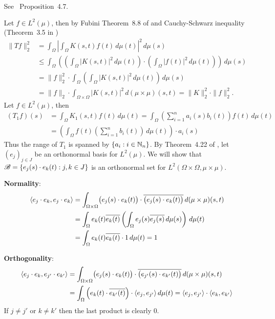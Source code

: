 \begin{enumerate}
See \cite{Conway1990}~Proposition~4.7.
\begin{itemize}
Let \(f\in L^2(\mu)\),
then by Fubini  Theorem~8.8 of \cite{RudinRCA80}
and Cauchy-Schwarz  inequality
(Theorem~3.5 in \cite{RudinRCA80}) 
\begin{align*}
\|Tf\|_2^2 
&= \int_\Omega\left|\int_\Omega K(s,t)f(t)\,d\mu(t)\right|^2\,d\mu(s) \\
&\leq \int_\Omega
   \left(
   \left(\int_\Omega |K(s,t)|^2\,d\mu(t)\right)
   \cdot
   \left(\int_\Omega |f(t)|^2\,d\mu(t)\right)
   \right)
   \,d\mu(s) \\
&= \|f\|_2^2 \cdot
   \int_\Omega\left(\int_\Omega |K(s,t)|^2\,d\mu(t)\right)\,d\mu(s) \\
&= \|f\|_2 \cdot \int_{\Omega\times\Omega} |K(s,t)|^2\,d(\mu\times\mu)(s,t)
 = \|K\|_2^2 \cdot \|f\|_2^2.
\end{align*}
Let \(f\in L^2(\mu)\), then
\begin{align*}
(T_1f)(s) 
&= \int_\Omega K_1(s,t)f(t)\,d\mu(t)
 = \int_\Omega \left(\sum_{i=1}^n a_i(s)b_i(t)\right)f(t)\,d\mu(t) \\
&= \left(\int_\Omega f(t)\left(\sum_{i=1}^n b_i(t)\right)\,d\mu(t)\right)
    \cdot a_i(s)
\end{align*}
Thus the range of \(T_1\) is spanned by \(\{a_i:i\in\mathbb{N}_n\}\). 
By Theorem~4.22 of \cite{RudinRCA80}, let \((e_j)_{j\in J}\) be 
an orthonormal basis for \(L^2(\mu)\).
We will show that \(\mathscr{B} = \{e_j(s)\cdot e_k(t): j,k\in J\}\)
is an orthonormal set %
for \(L^2(\Omega\times\Omega,\mu\times\mu)\).

\textbf{Normality}:
\begin{align*}
\langle e_j\cdot e_k, e_j\cdot e_k \rangle
&= 
 \int_{\Omega\times\Omega} 
 \bigl(e_j(s)\cdot e_k(t)\bigr)
 \cdot
 \overline{\bigl(e_j(s)\cdot e_k(t)\bigr)}
 \,d(\mu\times\mu)(s,t) \\
&= \int_\Omega 
   e_k(t)\overline{e_k(t)}
   \left(\int_\Omega e_j(s)\overline{e_j(s)}\,d\mu(s)\right)
   \,d\mu(t) \\
&= \int_\Omega e_k(t)\overline{e_k(t)}\cdot 1\,d\mu(t)
 = 1
\end{align*}

\textbf{Orthogonality}:
\begin{align*}
\langle e_j\cdot e_k, e_{j'}\cdot e_{k'} \rangle
&= 
 \int_{\Omega\times\Omega} 
 \bigl(e_j(s)\cdot e_k(t)\bigr)
 \cdot
 \overline{\bigl(e_{j'}(s)\cdot e_{k'}(t)\bigr)}
 \,d(\mu\times\mu)(s,t) \\
&= \int_\Omega 
   \left(e_k(t)\cdot\overline{e_{k'}(t)}\right)
   \cdot \langle e_j,e_{j'} \rangle
   \,d\mu(t)
 = \langle e_j,e_{j'} \rangle\cdot \langle e_k,e_{k'} \rangle
\end{align*}
If \(j\neq j'\) or \(k\neq k'\) then the last product is clearly $0$.


\end{itemize}
\end{enumerate}
